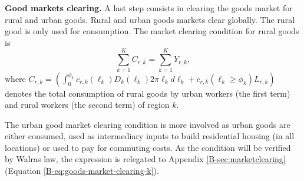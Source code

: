 \documentclass[20250130-paper.tex]{subfiles}
\begin{document}
\textbf{Good markets clearing.} A last step consists in clearing the goods market for rural and urban goods. Rural and urban goods markets clear globally. The rural good is only used for consumption. The market clearing condition for rural goods is
\begin{equation}
\sum_{k=1}^K C_{r,k}=\sum_{k=1}^K  Y_{r,k}\label{eq:mcrural},
\end{equation}
where $C_{r,k}=\left( \int_0^{\phi_k} c_{r,k}(\ell_k)D_k(\ell_k) 2\pi \ell_k d\ell_k+ c_{r,k}(\ell_k \geq \phi_k)L_{r,k}\right)$ denotes the total consumption of rural goods by urban workers (the first term) and rural workers (the second term) of region $k$.

The urban good market clearing condition is more involved as urban goods are either consumed, used as intermediary inputs to build residential housing (in all locations) or used to pay for commuting costs. As the condition will be verified by Walras law, the expression is relegated to Appendix \ref{B-sec:marketclearing} (Equation \eqref{B-eq:goods-market-clearing-k}).

\end{document}
